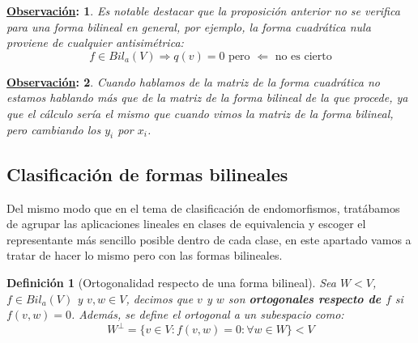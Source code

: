 \documentclass[10pt,a4paper,openright]{book}
\theoremstyle{break}
\newtheorem*{defi}{Definición}
\newtheorem*{obs}{\underline{Observación}:}
\begin{document}
\begin{obs}
Es notable destacar que la proposición anterior no se verifica para una forma bilineal en general, por ejemplo, la forma cuadrática nula proviene de cualquier antisimétrica:
$$f\in Bil_a(V) \Rightarrow q(v) = 0 \mbox{ pero }\Leftarrow \mbox{ no es cierto}$$
\end{obs}

\begin{obs}
Cuando hablamos de la matriz de la forma cuadrática no estamos hablando más que de la matriz de la forma bilineal de la que procede, ya que el cálculo sería el mismo que cuando vimos la matriz de la forma bilineal, pero cambiando los $y_i$ por $x_i$.
\end{obs}

\subsection{Clasificación de formas bilineales}
Del mismo modo que en el tema de clasificación de endomorfismos, tratábamos de agrupar las aplicaciones lineales en clases de equivalencia y escoger el representante más sencillo posible dentro de cada clase, en este apartado vamos a tratar de hacer lo mismo pero con las formas bilineales.

\begin{defi}[Ortogonalidad respecto de una forma bilineal]
Sea $W<V$, $f\in Bil_a(V)$ y $v,w\in V$, decimos que $v$ y $w$ son \textbf{ortogonales respecto de $f$} si $f(v,w)=0$. Además, se define el ortogonal a un subespacio como:
$$W^\perp=\{v\in V: f(v,w)=0: \forall w\in W\} < V$$
\end{defi}
\end{document}
